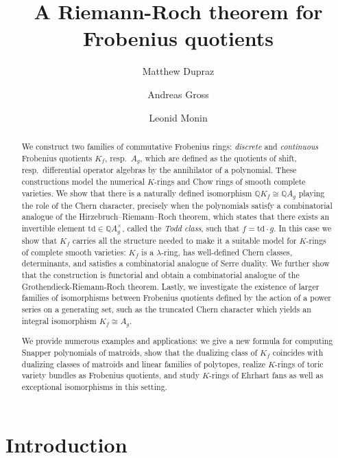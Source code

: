 \documentclass[oneside]{amsart}
\title{A Riemann-Roch theorem for Frobenius quotients}
\author{Matthew Dupraz
    \and
    Andreas Gross
    \and
    Leonid Monin
}
\theoremstyle{plain}
\theoremstyle{definition}
\newcommand{\Q}{{\mathbb{Q}}}
\newcommand{\td}{{\mathrm{td}}}
\begin{document}
\begin{abstract}
We construct two families of commutative Frobenius rings: \emph{discrete} and \emph{continuous} Frobenius quotients $K_f$, resp.\ $A_g$, which are defined as the quotients of shift, resp.\ differential operator algebras by the annihilator of a polynomial. These constructions model the numerical $K$-rings and Chow rings of smooth complete varieties. We show that there is a naturally defined isomorphism $\Q K_f \cong \Q A_g$ playing the role of the Chern character, precisely when the polynomials satisfy a combinatorial analogue of the Hirzebruch--Riemann--Roch theorem, which states that there exists an invertible element $\td \in \Q A_g^\times$, called the \emph{Todd class}, such that $f = \td \cdot g$. In this case we show that $K_f$ carries all the structure needed to make it a suitable model for $K$-rings of complete smooth varieties: $K_f$ is a $\lambda$-ring, has well-defined Chern classes, determinants, and satisfies a combinatorial analogue of Serre duality.
We further show that the construction is functorial and obtain a combinatorial analogue of the Grothendieck-Riemann-Roch theorem.
Lastly, we investigate the existence of larger families of isomorphisms between Frobenius quotients defined by the action of a power series on a generating set, such as the truncated Chern character which yields an integral isomorphism $K_f \cong A_g$.

We provide numerous examples and applications: we give a new formula for computing Snapper polynomials of matroids, show that the dualizing class of $K_f$ coincides with dualizing classes of matroids and linear families of polytopes, realize $K$-rings of toric variety bundles as Frobenius quotients, and study $K$-rings of Ehrhart fans as well as exceptional isomorphisms in this setting. 
\end{abstract}

\maketitle




\section{Introduction}
\label{sec:intro}
\end{document}
